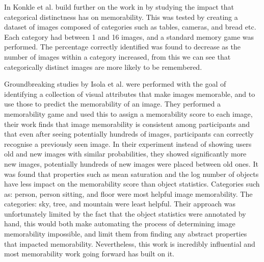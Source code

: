 \documentclass{UoYCSproject}
\begin{document}

In \cite{KonkleDistinct} Konkle et al. build further on the work in \cite{standing10000pictures, brady2008visual} by studying the impact that categorical distinctness has on memorability. This was tested by creating a dataset of images composed of categories such as tables, cameras, and bread etc. Each category had between 1 and 16 images, and a standard memory game was performed. The percentage correctly identified was found to decrease as the number of images within a category increased, from this we can see that categorically distinct images are more likely to be remembered.

Groundbreaking studies by Isola et al. \cite{Isola2011, IsolaParikhTorralbaOliva2011} were performed with the goal of identifying a collection of visual attributes that make images memorable, and to use those to predict the memorability of an image.
They performed a memorability game and used this to assign a memorability score to each image, their work finds that image memorability is consistent among participants and that even after seeing potentially hundreds of images, participants can correctly recognise a previously seen image. 
In their experiment instead of showing users old and new images with similar probabilities, they showed significantly more new images, potentially hundreds of new images were placed between old ones. 
It was found that properties such as mean saturation and the log number of objects have less impact on the memorability score than object statistics. Categories such as: person, person sitting, and floor were most helpful image memorability. The categories: sky, tree, and mountain were least helpful.
Their approach was unfortunately limited by the fact that the object statistics were annotated by hand, this would both make automating the process of determining image memorability impossible, and limit them from finding any abstract properties that impacted memorability. Nevertheless, this work is incredibly influential and most memorability work going forward has built on it.
\end{document}
